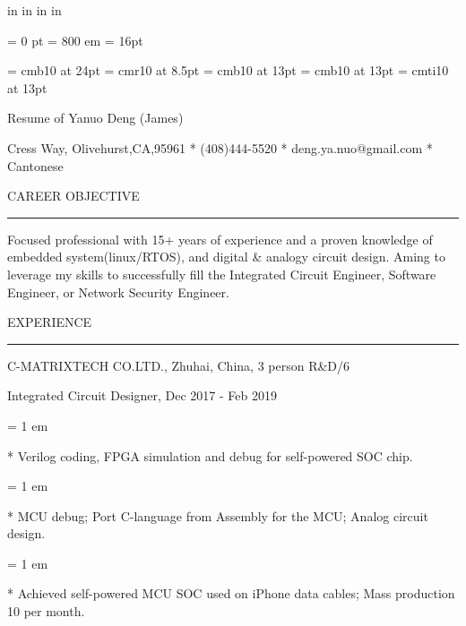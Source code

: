 in     %
 in    %
 in  %
 in  %


\nopagenumbers

\parindent = 0 pt
\emergencystretch = 800 em
\baselineskip = 16pt


\font\FFaa=      cmb10            at 24pt
\font\FFbb=      cmr10            at 8.5pt
\font\FFcc=      cmb10            at 13pt
\font\FFdd=      cmb10            at 13pt
\font\FFee=      cmti10           at 13pt


\bigbreak

\centerline{ \FFaa
Resume of Yanuo Deng (James)
}

\centerline{  Cress Way, Olivehurst,CA,95961
*
(408)444-5520
*
deng.ya.nuo@gmail.com
*
Cantonese
}

{ \medbreak } { \FFcc
CAREER OBJECTIVE
}

{ \smallbreak } {\par\noindent\hrule} { \smallbreak }

Focused professional with 15+ years of experience and a proven knowledge of embedded system(linux/RTOS), and digital \& analogy circuit design. Aming to leverage my skills to successfully fill the Integrated Circuit Engineer, Software Engineer, or Network Security Engineer.

{ \medbreak } { \FFcc
EXPERIENCE
}
{ \smallbreak } {\par\noindent\hrule} { \smallbreak }

{ \medbreak } { \FFdd
C-MATRIXTECH CO.LTD., Zhuhai, China, 3 person R\&D/6
}

{ \FFee
Integrated Circuit Designer, Dec 2017 - Feb 2019
}

{ \parindent = 1 em \item{*} 
 Verilog coding, FPGA simulation and debug for self-powered SOC chip. 
}

{ \parindent = 1 em \item{*} 
 MCU debug; Port C-language from Assembly for the MCU; Analog circuit design.
}
{ \parindent = 1 em \item{*} 
 Achieved self-powered MCU SOC used on iPhone data cables; Mass production 10 per month.
}

